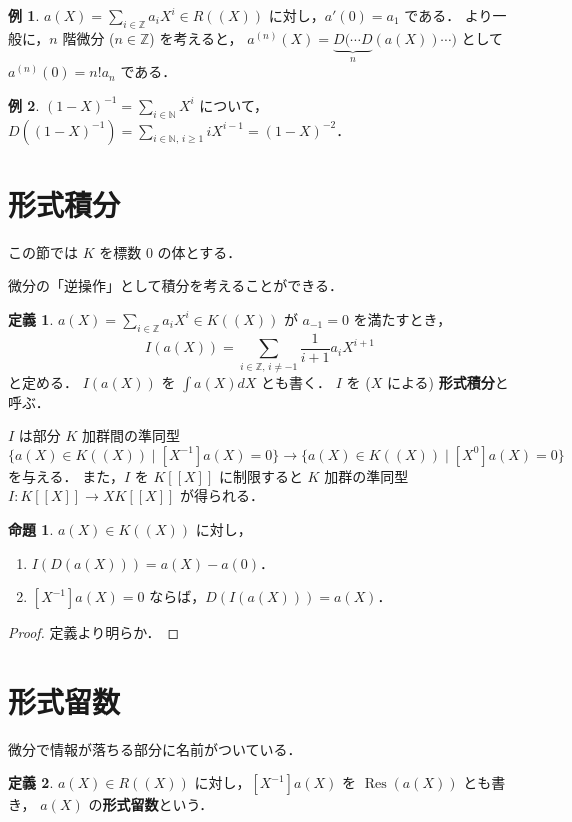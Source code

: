 \documentclass{jsarticle}
\DeclareMathOperator{\Res}{Res}
\newcommand{\N}{\mathbb{N}}
\newcommand{\Z}{\mathbb{Z}}
\newcommand{\longto}{\longrightarrow}
\theoremstyle{definition}
\newtheorem*{Dfn}{定義}
\newtheorem*{Exm}{例}
\newtheorem{Prp}{命題}
\newenvironment{dfn}{\vspace{1ex}\begin{screen}\begin{Dfn}}{\end{Dfn}\end{screen}\vspace{1ex}}
\newenvironment{exm}{\begin{leftbar}\begin{Exm}}{\end{Exm}\end{leftbar}}
\newenvironment{prp}{\vspace{1ex}\begin{screen}\begin{Prp}}{\end{Prp}\end{screen}}
\newenvironment{prf}{\begin{leftbar}\begin{proof}}{\end{proof}\end{leftbar}}
\begin{document}
\begin{exm}
  $a(X) = \sum_{i\in\Z} a_i X^i \in R((X))$ に対し，$a'(0) = a_1$ である．
  より一般に，$n$ 階微分 ($n \in \Z$) を考えると，
  $a^{(n)}(X) = \underbrace{D(\cdots D}_n (a(X)) \cdots)$ として $a^{(n)}(0) = n! a_n$ である．
\end{exm}

\begin{exm}
  $(1 - X)^{-1} = \sum_{i\in\N} X^i$ について，
  $D((1 - X)^{-1}) = \sum_{i\in\N,\,i\ge 1} i X^{i-1} = (1 - X)^{-2}$．
\end{exm}


\section{形式積分}
この節では $K$ を標数 $0$ の体とする．

微分の「逆操作」として積分を考えることができる．

\begin{dfn}
  $a(X) = \sum_{i\in\Z} a_i X^i \in K((X))$ が $a_{-1} = 0$ を満たすとき，
  \[
    I(a(X)) = \sum_{i\in\Z,\,i\ne -1} \frac{1}{i + 1} a_i X^{i+1}
  \]
  と定める．
  $I(a(X))$ を $\int a(X) dX$ とも書く．
  $I$ を ($X$ による) \textbf{形式積分}と呼ぶ．
\end{dfn}

$I$ は部分 $K$ 加群間の準同型
$\{ a(X) \in K((X)) \mid [X^{-1}] a(X) = 0 \} \longto \{ a(X) \in K((X)) \mid [X^0] a(X) = 0 \}$ を与える．
また，$I$ を $K[[X]]$ に制限すると
$K$ 加群の準同型 $I\colon K[[X]] \longto X K[[X]]$ が得られる．

\begin{prp}
  $a(X) \in K((X))$ に対し，
  \begin{enumerate}[(1)]
    \item $I(D(a(X))) = a(X) - a(0)$．
    \item $[X^{-1}] a(X) = 0$ ならば，$D(I(a(X))) = a(X)$．
  \end{enumerate}
\end{prp}
\begin{prf}
  定義より明らか．
\end{prf}

\section{形式留数}
微分で情報が落ちる部分に名前がついている．

\begin{dfn}
  $a(X) \in R((X))$ に対し，$[X^{-1}] a(X)$ を $\Res(a(X))$ とも書き，
  $a(X)$ の\textbf{形式留数}という．
\end{dfn}
\end{document}
